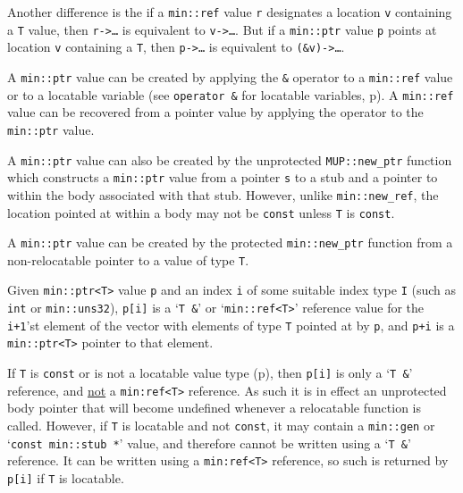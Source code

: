 \documentclass[12pt]{article}
\newcommand{\pagref}[1]{p\pageref{#1}}
\newcommand{\EOL}{\penalty \exhyphenpenalty}
\begin{document}
Another difference is the if a {\tt min::\EOL ref\TARG} value {\tt r}
designates a location {\tt v} containing a {\tt T} value, then
{\tt r->\ldots} is equivalent to {\tt v->\ldots}.
But if a {\tt min::\EOL ptr\TARG} value {\tt p}
points at location {\tt v} containing a {\tt T}, then
{\tt p->\ldots} is equivalent to {\tt (\&v)->\ldots}.

A {\tt min::\EOL ptr\TARG} value can be created by applying the
{\tt \&} operator to a {\tt min::\EOL ref\TARG} value or to a
locatable variable (see {\tt operator \&} for locatable variables,
\pagref{LOCATABLE_VAR_PTR}).
A {\tt min::\EOL ref\TARG} value can be recovered from a
pointer value by applying the
{\tt *} operator to the {\tt min::\EOL ptr\TARG} value.

A {\tt min::\EOL ptr\TARG} value can also be created by the
unprotected {\tt MUP::\EOL new\_\EOL ptr} function which
constructs a {\tt min::\EOL ptr\TARG} value
from a pointer {\tt s} to a stub and a pointer to
within the body associated with that stub.
However, unlike {\tt min::\EOL new\_\EOL ref},
the location pointed at within a body may not be {\tt const} unless {\tt T} is
{\tt const}.

A {\tt min::\EOL ptr\TARG} value can be created by the
protected {\tt min::\EOL new\_\EOL ptr} function from
a non-relocatable pointer to a value of type {\tt T}.

Given {\tt min::\EOL ptr<T>} value {\tt p} and an index {\tt i} of some
suitable index type {\tt I} (such as {\tt int} or {\tt min::\EOL uns32}),
{\tt p[i]} is a `{\tt T \&}' or `{\tt min::\EOL ref<T>}'
reference value for the {\tt i+1}'st element of
the vector with elements of type {\tt T} pointed at by {\tt p}, and
{\tt p+i} is a {\tt min::\EOL ptr<T>} pointer to that element.

If {\tt T} is {\tt const} or is not a locatable value type
(\pagref{LOCATABLE-VALUE}), then
{\tt p[i]} is only a `{\tt T \&}' reference, and
\underline{not} a {\tt min:\EOL ref<T>} reference.  As such it is
in effect an unprotected body pointer that will become undefined whenever
a relocatable function is called.
However, if {\tt T} is locatable and not {\tt const},
it may contain a {\tt min::gen} or `{\tt const min::\EOL stub *}' value,
and therefore cannot be written using a
`{\tt T \&}' reference.  It can be written using a
{\tt min:\EOL ref<T>} reference, so such is returned by {\tt p[i]} if
{\tt T} is locatable.
\end{document}
